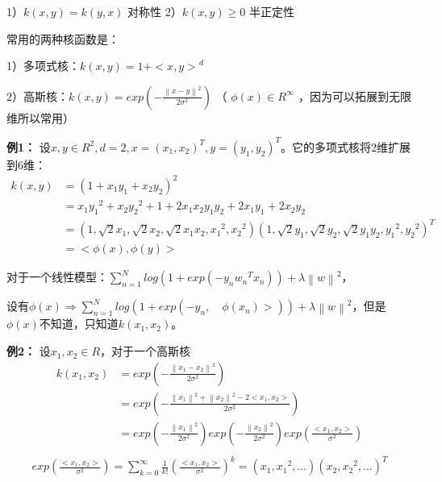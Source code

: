 \documentclass[12pt,UTF8,AutoFakeBold]{article}
\begin{document}
1）$k(x,y)=k(y,x)$ 对称性
2）$k(x,y)\ge0$ 半正定性

常用的两种核函数是：

1）多项式核：$k(x,y)={1+<x,y>}^d$ 

2）高斯核：$k(x,y)=exp(-\frac { { \left\| x-y \right\|  }^{ 2 } }{ 2{ \sigma  }^{ 2 } } )$  （ $\phi(x)\in R^\infty $ ，因为可以拓展到无限维所以常用）

\textbf{例1：} 设$x,y\in R^2, d=2, x={(x_1,x_2)}^T, y={(y_1,y_2)}^T$。它的多项式核将2维扩展到6维：
\begin{equation}
\begin{aligned}
k(x,y) & ={(1+x_1y_1+x_2y_2)}^2\\ 
& ={x_1y_1}^2+{x_2y_2}^2+1+2x_1x_2y_1y_2+2x_1y_1+2x_2y_2\\ 
& =(1,\sqrt { 2 } { x }_{ 1 },\sqrt { 2 } { x }_{ 2 },\sqrt { 2 } { x }_{ 1 }{ x }_{ 2 },{ { x }_{ 1 } }^{ 2 },{ { x }_{ 2 } }^{ 2 }){ (1,\sqrt { 2 } { y }_{ 1 },\sqrt { 2 } { y }_{ 2 },\sqrt { 2 } { y }_{ 1 }{ y }_{ 2 },{ { y }_{ 1 } }^{ 2 },{ { y }_{ 2 } }^{ 2 }) }^{ T } \\ 
& =<\phi(x),\phi(y)>
\end{aligned}
\end{equation}

对于一个线性模型：$\sum _{ n=1 }^{ N }{ log(1+exp(-y_n{ w_n }^{ T }x_n))+\lambda { \left\| w \right\|  }^{ 2 } } $，

设有$\phi (x)\Rightarrow \sum _{ n=1 }^{ N }{ log(1+exp(-{ y }_{ n }{ ,\quad \phi ({ x }_{ n }) }>))+\lambda { \left\| w \right\|  }^{ 2 } } $，但是$\phi(x)$不知道，只知道$k(x_1,x_2)$。

\textbf{例2：} 设$x_1,x_2\in R$，对于一个高斯核
\begin{equation}
\begin{aligned}
k(x_1,x_2) & =exp(-\frac { { \left\| { x }_{ 1 }-{ x }_{ 2 } \right\|  }^{ 2 } }{ 2{ \sigma  }^{ 2 } } )\\ 
& =exp(-\frac { { \left\| { x }_{ 1 } \right\|  }^{ 2 }+{ \left\| { x }_{ 2 } \right\|  }^{ 2 }-2<{ x }_{ 1 },{ x }_{ 2 }> }{ 2{ \sigma  }^{ 2 } } )\\ 
& = exp(-\frac { { \left\| { x }_{ 1 } \right\|  }^{ 2 } }{ 2{ \sigma  }^{ 2 } } )exp(-\frac { { \left\| { x }_{ 2 } \right\|  }^{ 2 } }{ 2{ \sigma  }^{ 2 } }) exp(\frac { <{ x }_{ 1 },{ x }_{ 2 }> }{ { \sigma  }^{ 2 } } )\\ 
\end{aligned}
\end{equation}
\begin{equation}
\begin{aligned}
exp(\frac { <{ x }_{ 1 },{ x }_{ 2 }> }{ { \sigma  }^{ 2 } } )=\sum _{ k=0 }^{ \infty  }{ \frac { 1 }{ k! } { (\frac { <{ x }_{ 1 },{ x }_{ 2 }> }{ { \sigma  }^{ 2 } } ) }^{ k }=({ x }_{ 1 },{ { x }_{ 1 } }^{ 2 },...){ ({ x }_{ 2 },{ { x }_{ 2 } }^{ 2 },...) }^{ T } } \\ 
\end{aligned}
\end{equation}
\end{document}

